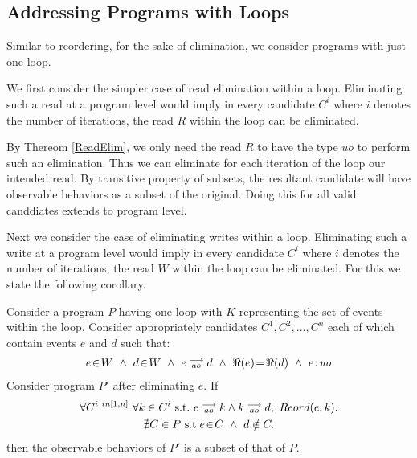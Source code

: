 \subsection{Addressing Programs with Loops}
    
        Similar to reordering, for the sake of elimination, we consider programs with just one loop. 
        
        We first consider the simpler case of read elimination within a loop. 
        Eliminating such a read at a program level would imply in every candidate $C^i$ where $i$ denotes the number of iterations, the read $R$ within the loop can be eliminated.
        
        By Thereom \ref{ReadElim}, we only need the read $R$ to have the type $uo$ to perform such an elimination.
        Thus we can eliminate for each iteration of the loop our intended read. 
        By transitive property of subsets, the resultant candidate will have observable behaviors as a subset of the original. 
        Doing this for all valid canddiates extends to program level.

        Next we consider the case of eliminating writes within a loop. 
        Eliminating such a write at a program level would imply in every candidate $C^i$ where $i$ denotes the number of iterations, the read $W$ within the loop can be eliminated.
        For this we state the following corollary.
        \begin{corollary}
            Consider a program $P$ having one loop with $K$ representing the set of events within the loop. Consider appropriately candidates $C^1, C^2, ... , C^n$ each of which contain events $e$ and $d$ such that:
            \begin{align*}
                \event{e}{W} \ \wedge \ \event{d}{W} \ \wedge \ \reln{e}{ao}{d} \ \wedge \ \Re(e)\!=\!\Re(d) \ \wedge \ \et{e}{uo}
            \end{align*}
            Consider program $P'$ after eliminating $e$. 
            If
            \begin{gather*}
                  \forall C^{i \ in [1,n]} \ \forall k \in C^i \ \text{s.t.} \ \reln{e}{ao}{k} \wedge \reln{k}{ao}{d}, \ Reord(e,k). \\ 
                  \nexists C \in P \ \text{s.t.} \event{e}{C} \ \wedge \  d \notin C.
            \end{gather*}
            then the observable behaviors of $P'$ is a subset of that of $P$. 
        \end{corollary}

